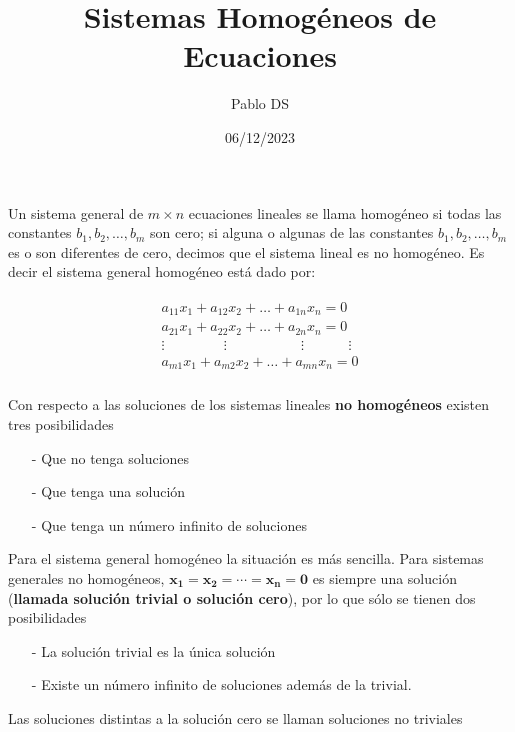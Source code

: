 \documentclass{article}
\title{Sistemas Homogéneos de Ecuaciones}
\author{Pablo DS}
\date{06/12/2023}
\begin{document}
\maketitle

Un sistema general de $m \times n$ ecuaciones lineales se llama homogéneo si todas las constantes $b_1, b_2,\dots, b_m$ son cero; si alguna o algunas de las constantes  $b_1, b_2,\dots, b_m$ es o son diferentes de cero, decimos que el sistema lineal es no homogéneo. Es decir el sistema general homogéneo está dado por: 

\begin{equation*}
    \begin{matrix}
        \begin{aligned}
            a_{11}x_1 + a_{12}x_2 + \dots + a_{1n}x_n = 0\\
            a_{21}x_1 + a_{22}x_2 + \dots + a_{2n}x_n = 0\\
            \vdots \phantom{aaaaaaaa} \vdots \phantom{aaaaaaaaaa} \vdots \phantom{aaaaaa} \vdots\\
            a_{m1}x_1 + a_{m2}x_2 + \dots + a_{mn}x_n = 0\\
        \end{aligned}
    \end{matrix}
\end{equation*}

Con respecto a las soluciones de los sistemas lineales \textbf{no homogéneos} existen tres posibilidades
\begin{itemize}
    \item[-] Que no tenga soluciones
    \item[-] Que tenga una solución
    \item[-] Que tenga un número infinito de soluciones
\end{itemize}  

Para el sistema general homogéneo la situación es más sencilla. Para sistemas generales no homogéneos, $\mathbf{x_1 = x_2 = \dotsb = x_n = 0}$ es siempre una solución (\textbf{llamada solución trivial o solución cero}), por lo que sólo se tienen dos posibilidades
\begin{itemize}
    \item[-] La solución trivial es la única solución
    \item[-] Existe un número infinito de soluciones además de la trivial.
\end{itemize} 
Las soluciones distintas a la solución cero se llaman soluciones no triviales
\end{document}
